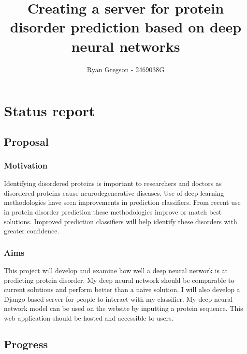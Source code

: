 \documentclass[11pt]{article}
\title{ {{Creating a server for protein disorder prediction based on deep neural networks}} }
\author{ {{Ryan Gregson}} - {{2469038G}} }
\begin{document}
\maketitle

\section{Status report}

\subsection{Proposal}\label{proposal}

\subsubsection{Motivation}\label{motivation}
Identifying disordered proteins is important to researchers and doctors as disordered proteins cause neurodegenerative diseases. Use of deep learning methodologies have seen improvements in prediction classifiers. From recent use in protein disorder prediction these methodologies improve or match best solutions. Improved prediction classifiers will help identify these disorders with greater confidence.

\subsubsection{Aims}\label{aims}
This project will develop and examine how well a deep neural network is at predicting protein disorder. My deep neural network should be comparable to current solutions and perform better than a naïve solution. I will also develop a Django-based server for people to interact with my classifier. My deep neural network model can be used on the website by inputting a protein sequence. This web application should be hosted and accessible to users.

\subsection{Progress}\label{progress}
\end{document}
